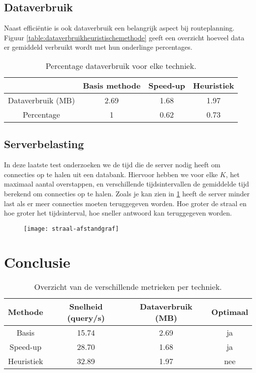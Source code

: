 \subsection{Dataverbruik}
\label{dataverbruik-heuristiek}

Naast effici\"entie is ook dataverbruik een belangrijk aspect bij routeplanning. Figuur \ref{table:dataverbruikheuristischemethode} geeft een overzicht hoeveel data er gemiddeld verbruikt wordt met hun onderlinge percentages. 

\begin{table}[htbp]
\centering
\begin{tabular}{ | c || c | c | c | }
 & Basis methode & Speed-up & Heuristiek \\ \hline
  Dataverbruik (MB) & 2.69 & 1.68 & 1.97 \\
  Percentage & 1 & 0.62  & 0.73 \\
\hline  
\end{tabular}
\caption{Percentage dataverbruik voor elke techniek.}
\label{table:dataverbruik}
\end{table}

\subsection{Serverbelasting}

In deze laatste test onderzoeken we de tijd die de server nodig heeft om connecties op te halen uit een databank. Hiervoor hebben we voor elke $K$, het maximaal aantal overstappen, en verschillende tijdsintervallen de gemiddelde tijd berekend om connecties op te halen. Zoals je kan zien in \ref{straalafstand} heeft de server minder last als er meer connecties moeten teruggegeven worden. Hoe groter de straal en hoe groter het tijdsinterval, hoe sneller antwoord kan teruggegeven worden.

\begin{figure}[h!]
\centering
\texttt{[image: straal-afstandgraf]}
\caption{}
\label{straalafstand}
\end{figure}

\section{Conclusie}

\begin{table}[htbp]
\centering
\begin{tabular}{ | c || c | c | c | }
 Methode & Snelheid (query/s) & Dataverbruik (MB) & Optimaal  \\ \hline
  Basis & 15.74 & 2.69 & ja \\
  Speed-up & 28.70 & 1.68 & ja \\
  Heuristiek & 32.89 & 1.97 & nee \\
\hline  
\end{tabular}
\caption{Overzicht van de verschillende metrieken per techniek.}
\label{table:dataverbruik}
\end{table}



